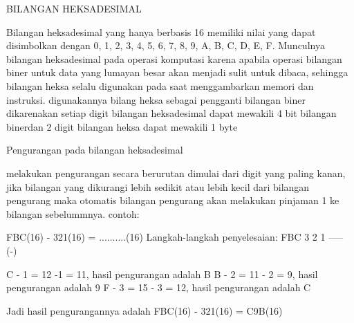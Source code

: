 	BILANGAN HEKSADESIMAL

Bilangan heksadesimal yang hanya berbasis 16 memiliki nilai yang dapat disimbolkan dengan 0, 1, 2, 3, 4, 5, 6, 7, 8, 9, A, B, C, D, E, F. Munculnya bilangan heksadesimal pada operasi komputasi karena apabila operasi bilangan biner untuk data yang lumayan besar akan menjadi sulit untuk dibaca, sehingga bilangan heksa selalu digunakan pada saat menggambarkan memori dan instruksi. digunakannya bilang heksa sebagai pengganti bilangan biner dikarenakan setiap digit bilangan heksadesimal dapat mewakili 4 bit bilangan binerdan 2 digit bilangan heksa dapat mewakili 1 byte 

	Pengurangan pada bilangan heksadesimal

melakukan pengurangan secara berurutan dimulai dari digit yang paling kanan, jika bilangan yang dikurangi lebih sedikit atau lebih kecil dari bilangan pengurang maka otomatis bilangan pengurang akan melakukan pinjaman 1 ke bilangan sebelummnya. contoh: 
	
	FBC(16) - 321(16) = ..........(16)
 Langkah-langkah penyelesaian: 
FBC 
3 2 1 ----- (-)

C - 1 = 12 -1 = 11, hasil pengurangan adalah B 
B - 2 = 11 - 2 = 9,  hasil pengurangan adalah 9
F - 3 = 15 - 3 = 12, hasil pengurangan adalah C 

Jadi hasil pengurangannya adalah  FBC(16) - 321(16) = C9B(16) 
